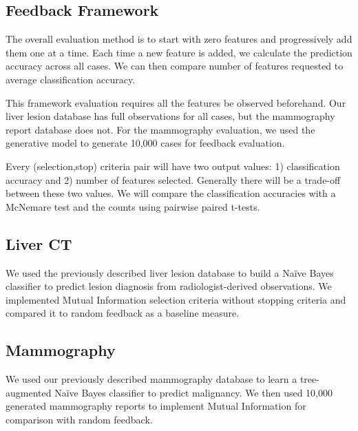 \subsection{Feedback Framework}
The overall evaluation method is to start with zero features and progressively add them one at a time. Each time a new feature is added, we calculate the prediction accuracy across all cases. We can then compare number of features requested to average classification accuracy.

This framework evaluation requires all the features be observed beforehand. Our liver lesion database has full observations for all cases, but the mammography report database does not. For the mammography evaluation, we used the generative model to generate 10,000 cases for feedback evaluation.

Every (selection,stop) criteria pair will have two output values: 1) classification accuracy and 2) number of features selected. Generally there will be a trade-off between these two values. We will compare the classification accuracies with a McNemare test \cite{Stock:2014tn} and the counts using pairwise paired t-tests.

\subsection{Liver CT}
We used the previously described liver lesion database to build a Na\"{i}ve Bayes classifier to predict lesion diagnosis from radiologist-derived observations. We implemented Mutual Information selection criteria without stopping criteria and compared it to random feedback as a baseline measure.

\subsection{Mammography}
We used our previously described mammography database to learn a tree-augmented Na\"{i}ve Bayes classifier to predict malignancy. We then used 10,000 generated mammography reports to implement Mutual Information for comparison with random feedback.